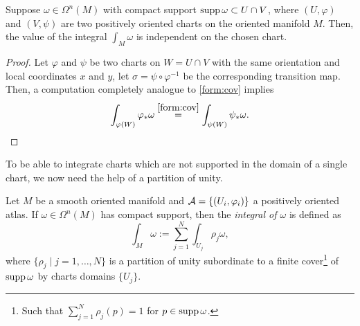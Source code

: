 \begin{lemma}\label{lemma:intindep:chart}
  Suppose $\omega\in\Omega^n(M)$ with compact support $\operatorname{supp} \omega \subset U\cap V$, where $(U, \varphi)$ and $(V, \psi)$ are two positively oriented charts on the oriented manifold $M$.
  Then, the value of the integral $\int_M\omega$ is independent on the chosen chart.
\end{lemma}
\begin{proof}
  Let $\varphi$ and $\psi$ be two charts on $W = U\cap V$ with the same orientation and local coordinates $x$ and $y$, let $\sigma = \psi\circ\varphi^{-1}$ be the corresponding transition map.
  Then, a computation completely analogue to \eqref{form:cov} implies
  \begin{align}
    \int_{\varphi(W)} \varphi_*\omega \overset{\eqref{form:cov}}{=} \int_{\psi(W)} \psi_*\omega.
  \end{align}
\end{proof}

To be able to integrate charts which are not supported in the domain of a single chart, we now need the help of a partition of unity.

\begin{definition}
  Let $M$ be a smooth oriented manifold and $\mathcal{A} = \{(U_i,\varphi_i)\}$ a positively oriented atlas.
  If $\omega \in \Omega^n(M)$ has compact support, then the \emph{integral of $\omega$} is defined as
  \begin{equation}\label{eq:intnform}
    \int_M \omega := \sum_{j=1}^N \int_{U_j}\rho_j\omega,
  \end{equation}
  where $\{\rho_j\mid j=1,\ldots, N\}$ is a partition of unity subordinate to a finite cover\footnote{Such that $\sum_{j=1}^N \rho_j(p) = 1$ for $p\in\operatorname{supp}\omega$.} of $\operatorname{supp} \omega$ by charts domains $\{U_j\}$.
\end{definition}

